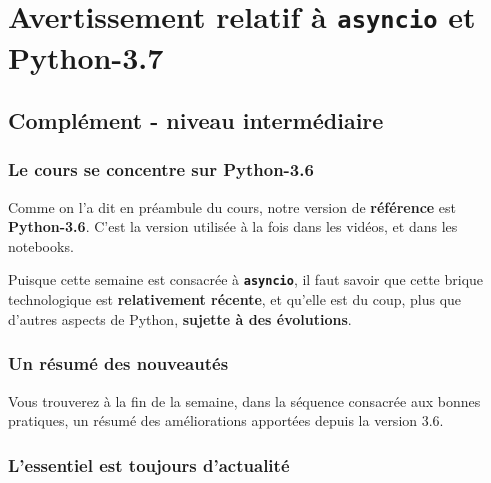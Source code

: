     
    
    
    

    

    \hypertarget{avertissement-relatif-uxe0-asyncio-et-python-3.7}{%
\section{\texorpdfstring{Avertissement relatif à \texttt{asyncio} et
Python-3.7}{Avertissement relatif à asyncio et Python-3.7}}\label{avertissement-relatif-uxe0-asyncio-et-python-3.7}}

    \hypertarget{compluxe9ment---niveau-intermuxe9diaire}{%
\subsection{Complément - niveau
intermédiaire}\label{compluxe9ment---niveau-intermuxe9diaire}}

    \hypertarget{le-cours-se-concentre-sur-python-3.6}{%
\subsubsection{Le cours se concentre sur
Python-3.6}\label{le-cours-se-concentre-sur-python-3.6}}

    Comme on l'a dit en préambule du cours, notre version de
\textbf{référence} est \textbf{Python-3.6}. C'est la version utilisée à
la fois dans les vidéos, et dans les notebooks.

Puisque cette semaine est consacrée à \textbf{\texttt{asyncio}}, il faut
savoir que cette brique technologique est \textbf{relativement récente},
et qu'elle est du coup, plus que d'autres aspects de Python,
\textbf{sujette à des évolutions}.

    \hypertarget{un-ruxe9sumuxe9-des-nouveautuxe9s}{%
\subsubsection{Un résumé des
nouveautés}\label{un-ruxe9sumuxe9-des-nouveautuxe9s}}

    Vous trouverez à la fin de la semaine, dans la séquence consacrée aux
bonnes pratiques, un résumé des améliorations apportées depuis la
version 3.6.

    \hypertarget{lessentiel-est-toujours-dactualituxe9}{%
\subsubsection{L'essentiel est toujours
d'actualité}\label{lessentiel-est-toujours-dactualituxe9}}

